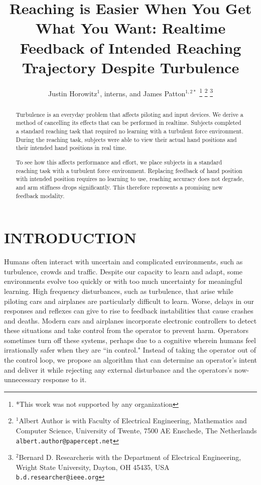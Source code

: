 \documentclass[letterpaper, 10 pt, conference]{ieeeconf}  %
\title{\LARGE \bf
Reaching is Easier When You Get What You Want: Realtime Feedback of Intended Reaching Trajectory Despite Turbulence
}
\author{Justin Horowitz$^{1}$, interns, and James Patton$^{1,2*}$%
\thanks{*This work was not supported by any organization}%
\thanks{$^{1}$Albert Author is with Faculty of Electrical Engineering, Mathematics and Computer Science,
       University of Twente, 7500 AE Enschede, The Netherlands
       {\tt\small albert.author@papercept.net}}%
\thanks{$^{2}$Bernard D. Researcheris with the Department of Electrical Engineering, Wright State University,
       Dayton, OH 45435, USA
       {\tt\small b.d.researcher@ieee.org}}%
}
\begin{document}
\maketitle
\thispagestyle{empty}
\pagestyle{empty}


\begin{abstract}
Turbulence is an everyday problem that affects piloting and input devices. We derive a method of cancelling its effects that can be performed in realtime. Subjects completed a standard reaching task that required no learning with a turbulent force environment. During the reaching task, subjects were able to view their actual hand positions and their intended hand positions in real time. 



To see how this affects performance and effort, we place subjects in a standard reaching task with a turbulent force environment. Replacing feedback of hand position with intended position requires no learning to use, reaching accuracy does not degrade, and arm stiffness drops significantly. This therefore represents a promising new feedback modality.
\end{abstract}


\section{INTRODUCTION}

Humans often interact with uncertain and complicated environments, such as turbulence, crowds and traffic. Despite our capacity to learn and adapt, some environments evolve too quickly or with too much uncertainty for meaningful learning. High frequency disturbances, such as turbulence, that arise while piloting cars and airplanes are particularly difficult to learn. Worse, delays in our responses and reflexes can give to rise to feedback instabilities that cause crashes and deaths. Modern cars and airplanes incorporate electronic controllers to detect these situations and take control from the operator to prevent harm. Operators sometimes turn off these systems, perhaps due to a cognitive wherein humans feel irrationally safer when they are ``in control." Instead of taking the operator out of the control loop, we propose an algorithm that can determine an operator's intent and deliver it while rejecting any external disturbance and the operators's now-unnecessary response to it.
\end{document}
